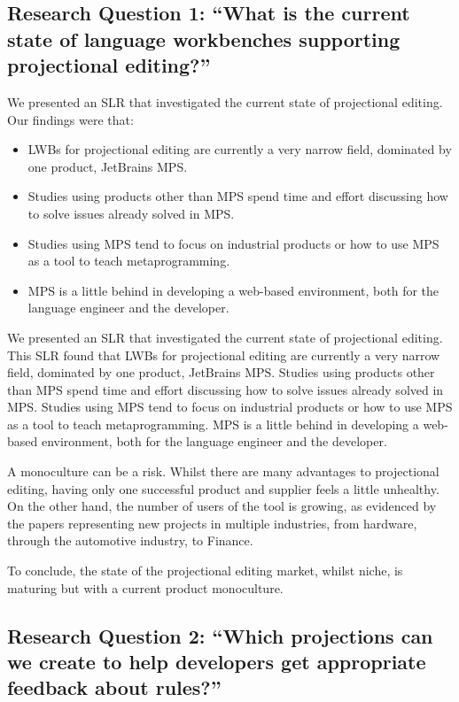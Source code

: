 \subsection{Research Question 1: ``What is the current state of language workbenches supporting projectional editing?''}
We presented an SLR that investigated the current state of projectional editing. 
Our findings were that:
\begin{itemize}
    \setlength\itemsep{0em}
    \item LWBs for projectional editing are currently a very narrow field, dominated by one product, JetBrains MPS. 
    \item Studies using products other than MPS spend time and effort discussing how to solve issues already solved in MPS. 
    \item Studies using MPS tend to focus on industrial products or how to use MPS as a tool to teach metaprogramming. 
    \item MPS is a little behind in developing a web-based environment, both for the language engineer and the developer.
\end{itemize}

We presented an SLR that investigated the current state of projectional editing.
This SLR found that LWBs for projectional editing are currently a very narrow field, dominated by one product, JetBrains MPS.
Studies using products other than MPS spend time and effort discussing how to solve issues already solved in MPS.
Studies using MPS tend to focus on industrial products or how to use MPS as a tool to teach metaprogramming.
MPS is a little behind in developing a web-based environment, both for the language engineer and the developer.

A monoculture can be a risk.
Whilst there are many advantages to projectional editing, having only one successful product and supplier feels a little unhealthy.
On the other hand, the number of users of the tool is growing, as evidenced by the papers representing new projects in multiple industries, from hardware, through the automotive industry, to Finance.

To conclude, the state of the projectional editing market, whilst niche, is maturing but with a current product monoculture.

\subsection{Research Question 2: ``Which projections can we create to help developers get appropriate feedback about rules?''}

